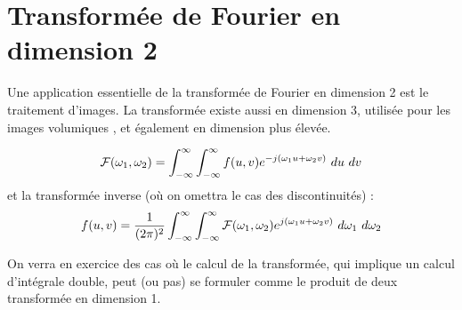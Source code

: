 \section{Transformée de Fourier en dimension 2}

Une application essentielle de la transformée de Fourier en dimension 2
est le traitement d'images.  La transformée existe aussi en dimension
3, utilisée pour les images { volumiques }, et également en
dimension plus élevée.

\begin{equation}
  {\cal F}(\omega_1,\omega_2)=\int_{-\infty}^{\infty} \int_{-\infty}^{\infty} f(u,v)e^{-j(\omega_1u+\omega_2v)}~du~dv
\end{equation}
et la transformée inverse (où on omettra le cas des discontinuités) :
\begin{equation}
  f(u,v)=  \frac{1}{(2\pi)^2} \int_{-\infty}^{\infty} \int_{-\infty}^{\infty} {\cal F}(\omega_1,\omega_2)e^{j(\omega_1u+\omega_2v)}~d\omega_1~d\omega_2
\end{equation}

On verra en exercice des cas où le calcul de la transformée, qui implique un calcul d'intégrale double, peut (ou pas) se formuler comme le produit de deux transformée en dimension 1.